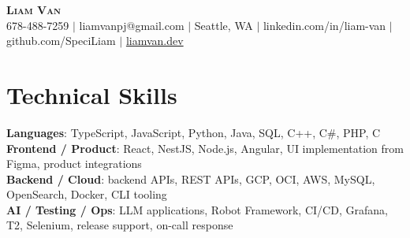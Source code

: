 \documentclass[letterpaper,11pt]{article}
\begin{document}

%
\begin{center}
    \textbf{\Huge \scshape Liam Van} \\ \vspace{1pt}
    \small 678-488-7259 $|$ \small {liamvanpj@gmail.com} $|$ Seattle, WA
 {{$|$ linkedin.com/in/liam-van} {$|$ github.com/SpeciLiam} {$|$ \href{https://liamvan.dev}{liamvan.dev}}}

\end{center}

\section{Technical Skills}
 \begin{itemize}[leftmargin=0.15in, label={}]
    \small{\item{
     \textbf{Languages}{: TypeScript, JavaScript, Python, Java, SQL, C++, C\#, PHP, C} \\
     \textbf{Frontend / Product}{: React, NestJS, Node.js, Angular, UI implementation from Figma, product integrations} \\
     \textbf{Backend / Cloud}{: backend APIs, REST APIs, GCP, OCI, AWS, MySQL, OpenSearch, Docker, CLI tooling} \\
     \textbf{AI / Testing / Ops}{: LLM applications, Robot Framework, CI/CD, Grafana, T2, Selenium, release support, on-call response} \\
    }}
 \end{itemize}
%

\end{document}
